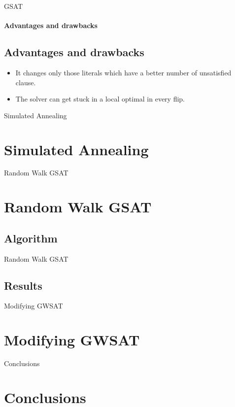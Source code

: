 \documentclass{beamer}
\begin{document}
\begin{frame}{GSAT}
\framesubtitle{Advantages and drawbacks}
\subsection{Advantages and drawbacks}
\begin{itemize}
	\item It changes only those literals which have a better number of unsatisfied clause. 
	\item The solver can get stuck in a local optimal in every flip.
\end{itemize}
\end{frame}

\begin{frame}{Simulated Annealing}
\section{Simulated Annealing}
\end{frame}

\begin{frame}{Random Walk GSAT}
\section{Random Walk GSAT}
\subsection{Algorithm}
\end{frame}

\begin{frame}{Random Walk GSAT}
\subsection{Results}
\end{frame}


\begin{frame}{Modifying GWSAT}
\section{Modifying GWSAT}
\end{frame}

\begin{frame}{Conclusions}
\section{Conclusions}
\end{frame}
\end{document}
